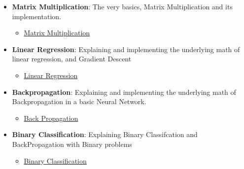 \documentclass{article}
\begin{document}
\begin{itemize}
    \item \textbf{Matrix Multiplication}: The very basics, Matrix Multiplication and its implementation.
    \begin{itemize}
        \item \href{/notebooks/StartingFromTheBasicsMatrixMultiplication.ipynb}{Matrix Multiplication}
    \end{itemize}
        \item \textbf{Linear Regression}: Explaining and implementing the underlying math of linear regression, and Gradient Descent
    \begin{itemize}
        \item \href{/notebooks/StartingFromTheBasicsLinearRegression.ipynb}{Linear Regression}
    \end{itemize}
    \item \textbf{Backpropagation}: Explaining and implementing the underlying math of Backpropagation in a basic Neural Network.
    \begin{itemize}
        \item \href{/notebooks/StartingFromTheBasicsBackPropagation.ipynb}{Back Propagation}
    \end{itemize}
    \item \textbf{Binary Classification}: Explaining Binary Classifcation and BackPropagation with Binary problems
    \begin{itemize}
        \item \href{/notebooks/StartingFromTheBasicsBinaryClassification.ipynb}{Binary Classification}
    \end{itemize}
\end{itemize}
\end{document}
